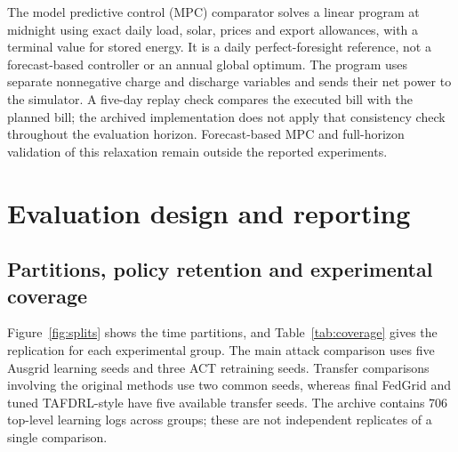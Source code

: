 \documentclass[preprint,12pt,a4paper]{elsarticle}
\begin{document}
\begin{table}[htbp]
\centering\small
\caption{Implemented perturbations. Compromised households are fixed within a run; message faults affect honest households.}
\label{tab:threats}
\end{table}



The model predictive control (MPC) comparator solves a linear program at midnight using exact daily load, solar, prices and export allowances, with a terminal value for stored energy. It is a daily perfect-foresight reference, not a forecast-based controller or an annual global optimum. The program uses separate nonnegative charge and discharge variables and sends their net power to the simulator. A five-day replay check compares the executed bill with the planned bill; the archived implementation does not apply that consistency check throughout the evaluation horizon. Forecast-based MPC and full-horizon validation of this relaxation remain outside the reported experiments.



\section{Evaluation design and reporting}
\label{sec:evaluation}
\subsection{Partitions, policy retention and experimental coverage}
Figure~\ref{fig:splits} shows the time partitions, and Table~\ref{tab:coverage} gives the replication for each experimental group. The main attack comparison uses five Ausgrid learning seeds and three ACT retraining seeds. Transfer comparisons involving the original methods use two common seeds, whereas final FedGrid and tuned TAFDRL-style have five available transfer seeds. The archive contains 706 top-level learning logs across groups; these are not independent replicates of a single comparison.
\end{document}
